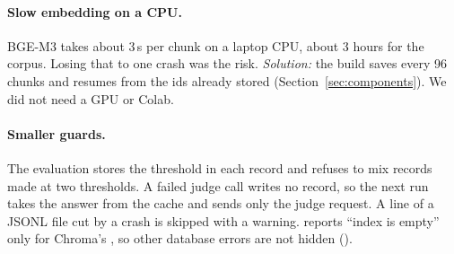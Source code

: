 \paragraph{Slow embedding on a CPU.}
BGE-M3 takes about 3\,s per chunk on a laptop CPU, about 3 hours for the corpus. Losing that to one
crash was the risk. \emph{Solution:} the build saves every 96 chunks and resumes from the ids already
stored (Section~\ref{sec:components}). We did not need a GPU or Colab.

\paragraph{Smaller guards.}
The evaluation stores the threshold in each record and refuses to mix records made at two
thresholds. A failed judge call writes no record, so the next run takes the answer from the cache
and sends only the judge request. A line of a JSONL file cut by a crash is skipped with a warning.
 reports ``index is empty'' only for Chroma's , so other
database errors are not hidden ().
